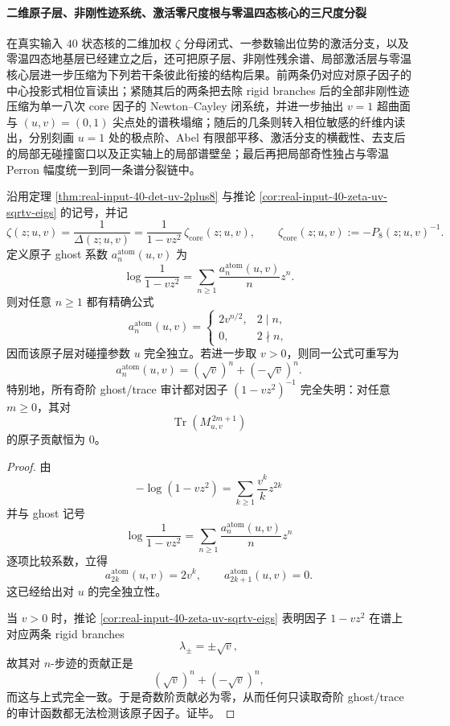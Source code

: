 \paragraph{二维原子层、非刚性迹系统、激活零尺度根与零温四态核心的三尺度分裂}
在真实输入 \(40\) 状态核的二维加权 \(\zeta\) 分母闭式、一参数输出位势的激活分支，以及零温四态地基层已经建立之后，还可把原子层、非刚性残余谱、局部激活层与零温核心层进一步压缩为下列若干条彼此衔接的结构后果。前两条仍对应对原子因子的中心投影式相位盲读出；紧随其后的两条把去除 rigid branches 后的全部非刚性迹压缩为单一八次 core 因子的 Newton--Cayley 闭系统，并进一步抽出 \(v=1\) 超曲面与 \((u,v)=(0,1)\) 尖点处的谱秩塌缩；随后的几条则转入相位敏感的纤维内读出，分别刻画 \(u=1\) 处的极点阶、Abel 有限部平移、激活分支的横截性、去支后的局部无碰撞窗口以及正实轴上的局部谱壁垒；最后再把局部奇性独占与零温 Perron 幅度统一到同一条谱分裂链中。

\begin{theorem}\label{thm:xi-time-part73-twoparam-atomic-ghost-u-blindness}
沿用定理 \ref{thm:real-input-40-det-uv-2plus8} 与推论 \ref{cor:real-input-40-zeta-uv-sqrtv-eigs} 的记号，并记
\[
\zeta(z;u,v)
=
\frac{1}{\Delta(z;u,v)}
=
\frac{1}{1-vz^2}\,\zeta_{\mathrm{core}}(z;u,v),
\qquad
\zeta_{\mathrm{core}}(z;u,v):=-P_8(z;u,v)^{-1}.
\]
定义原子 ghost 系数 \(a_n^{\mathrm{atom}}(u,v)\) 为
\[
\log\frac{1}{1-vz^2}
=
\sum_{n\ge 1}\frac{a_n^{\mathrm{atom}}(u,v)}{n}z^n.
\]
则对任意 \(n\ge 1\) 都有精确公式
\[
\boxed{\;
a_n^{\mathrm{atom}}(u,v)
=
\begin{cases}
2v^{n/2},& 2\mid n,\\[4pt]
0,& 2\nmid n,
\end{cases}\;}
\]
因而该原子层对碰撞参数 \(u\) 完全独立。若进一步取 \(v>0\)，则同一公式可重写为
\[
\boxed{\;
a_n^{\mathrm{atom}}(u,v)
=
(\sqrt v)^n+(-\sqrt v)^n.\;}
\]
特别地，所有奇阶 ghost/trace 审计都对因子 \((1-vz^2)^{-1}\) 完全失明：对任意 \(m\ge 0\)，其对
\[
\operatorname{Tr}(M_{u,v}^{\,2m+1})
\]
的原子贡献恒为 \(0\)。
\end{theorem}
\begin{proof}
由
\[
-\log(1-vz^2)=\sum_{k\ge 1}\frac{v^k}{k}z^{2k}
\]
并与 ghost 记号
\[
\log\frac{1}{1-vz^2}
=
\sum_{n\ge 1}\frac{a_n^{\mathrm{atom}}(u,v)}{n}z^n
\]
逐项比较系数，立得
\[
a_{2k}^{\mathrm{atom}}(u,v)=2v^k,
\qquad
a_{2k+1}^{\mathrm{atom}}(u,v)=0.
\]
这已经给出对 \(u\) 的完全独立性。

当 \(v>0\) 时，推论 \ref{cor:real-input-40-zeta-uv-sqrtv-eigs} 表明因子 \(1-vz^2\) 在谱上对应两条 rigid branches
\[
\lambda_\pm=\pm\sqrt v,
\]
故其对 \(n\)-步迹的贡献正是
\[
(\sqrt v)^n+(-\sqrt v)^n,
\]
而这与上式完全一致。于是奇数阶贡献必为零，从而任何只读取奇阶 ghost/trace 的审计函数都无法检测该原子因子。证毕。
\end{proof}


